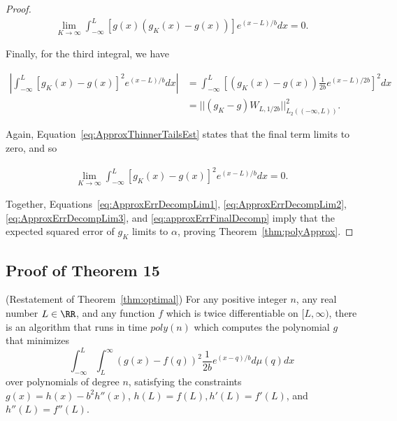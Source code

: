 \documentclass[11pt]{article}
\begin{document}
\begin{proof}
\begin{align} \label{eq:ApproxErrDecompLim2}
    \lim_{K \to \infty} \int_{-\infty}^L \left[g(x)(g_K(x) - g(x)) \right] e^{(x-L)/b} dx = 0.
\end{align}

Finally, for the third integral, we have

\begin{align}
    |\int_{-\infty}^L \left[g_K(x) - g(x)\right]^2 e^{(x-L)/b} dx|
    &= \int_{-\infty}^L \left[(g_K(x) - g(x))
    \frac{1}{2b} e^{(x-L)/2b}\right]^2 dx \\
    &= ||(g_K - g)W_{L,1/2b}||_{L_2((-\infty,L))}^2.
\end{align}

Again, Equation~\ref{eq:ApproxThinnerTailsEst} states that the final term limits to zero, and so

\begin{align} \label{eq:ApproxErrDecompLim3}
    \lim_{K \to \infty} \int_{-\infty}^L \left[g_K(x) - g(x)\right]^2 e^{(x-L)/b} dx = 0.
\end{align}

Together, Equations~\ref{eq:ApproxErrDecompLim1}, \ref{eq:ApproxErrDecompLim2}, \ref{eq:ApproxErrDecompLim3}, and \ref{eq:approxErrFinalDecomp} imply that the expected squared error of $g_K$ limits to $\alpha$, proving Theorem~\ref{thm:polyApprox}.

\end{proof}

\subsection{Proof of Theorem 15}
\label{app:thm15}

\begin{theorem}
    (Restatement of Theorem~\ref{thm:optimal}) For any positive integer $n$, any real number $L \in \RR$, and any function $f$ which is twice differentiable on $[L,\infty)$, there is an algorithm that runs in time $poly(n)$ which computes the polynomial $g$ that minimizes 
    $$\int_{-\infty}^L \int_L^\infty \left(g(x)-f(q)\right)^2 \frac{1}{2b} e^{(x-q)/b} d\mu(q) dx$$
    over polynomials of degree $n$, satisfying the constraints $g(x) = h(x) - b^2 h''(x)$, $h(L) = f(L), h'(L) = f'(L)$, and $h''(L) = f''(L)$.
\end{theorem}
\end{document}
